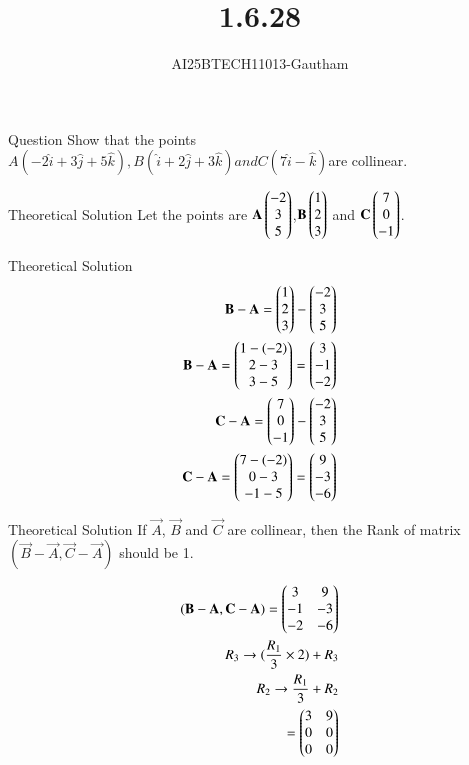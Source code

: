 \documentclass{beamer}
\title %
{1.6.28}
\author %
{AI25BTECH11013-Gautham}
\begin{document}
\frame{\titlepage}
\begin{frame}{Question}
Show that the points $A(-2\hat{i}+3\hat{j}+5\hat{k}),B(\hat{i}+2\hat{j}+3\hat{k}) and C(7\hat{i}-\hat{k})$are collinear. 
\end{frame}

\begin{frame}{Theoretical Solution}
Let the points are $\mathbf{A}\begin{pmatrix}-2\\3\\5\end{pmatrix}$,$\mathbf{B}\begin{pmatrix}1\\2\\3\end{pmatrix}$ and $\mathbf{C}\begin{pmatrix}7\\0\\-1\end{pmatrix}$.
\end{frame}

\begin{frame}{Theoretical Solution}
\begin{align}
\mathbf{B} - \mathbf{A} = \begin{pmatrix}1\\2\\3\end{pmatrix} - \begin{pmatrix}-2\\3\\5\end{pmatrix}  \\
\mathbf{B} - \mathbf{A} = \begin{pmatrix}1-(-2)\\2-3\\3-5\end{pmatrix} = \begin{pmatrix}3\\-1\\-2\end{pmatrix}  \\
\mathbf{C} - \mathbf{A} = \begin{pmatrix}7\\0\\-1\end{pmatrix} - \begin{pmatrix}-2\\3\\5\end{pmatrix}  \\
\mathbf{C} - \mathbf{A} = \begin{pmatrix}7-(-2)\\0-3\\-1-5\end{pmatrix} = \begin{pmatrix}9\\-3\\-6\end{pmatrix}  \\
\end{align}
\end{frame}

\begin{frame}{Theoretical Solution}
If $\vec{A}$, $\vec{B}$ and $\vec{C}$ are collinear, then the Rank of matrix $(\vec{B} - \vec{A},\vec{C} - \vec{A})$ should be 1.

\begin{align}
(\mathbf{B} - \mathbf{A},\mathbf{C} - \mathbf{A}) = \begin{pmatrix}3&9\\-1&-3\\-2&-6\end{pmatrix}  \\ 
R_3 \rightarrow (\frac{R_1}{3}\times2) + R_3  \\
R_2 \rightarrow \frac{R_1}{3} + R_2  \\
= \begin{pmatrix}3&9\\0&0\\0&0\end{pmatrix}  \\
\end{align}
\end{frame}
\end{document}

